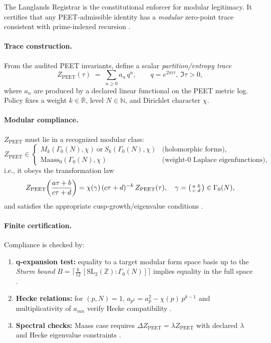 \documentclass[12pt]{amsart}
\theoremstyle{plain}
\begin{document}
The Langlands Registrar is the constitutional enforcer for modular legitimacy. It certifies that any PEET-admissible identity has a \emph{modular} zero-point trace consistent with prime-indexed recursion \cite{vanGelder2025pirtm}.

\paragraph{Trace construction.}
From the audited PEET invariants, define a scalar \emph{partition/entropy trace}
\[
Z_{\mathrm{PEET}}(\tau)\;=\;\sum_{n\ge 0} a_n\,q^n,\qquad q=e^{2\pi i\tau},\ \Im\tau>0,
\]
where $a_n$ are produced by a declared linear functional on the PEET metric log. Policy fixes a weight $k\in\mathbb{R}$, level $N\in\mathbb{N}$, and Dirichlet character $\chi$.

\paragraph{Modular compliance.}
$Z_{\mathrm{PEET}}$ must lie in a recognized modular class:
\[
Z_{\mathrm{PEET}}\in
\begin{cases}
M_k(\Gamma_0(N),\chi)\ \text{or}\ S_k(\Gamma_0(N),\chi) & \text{(holomorphic forms)},\\[2pt]
\text{Maass}_0(\Gamma_0(N),\chi) & \text{(weight-0 Laplace eigenfunctions)},
\end{cases}
\]
i.e., it obeys the transformation law
\[
Z_{\mathrm{PEET}}\!\left(\frac{a\tau+b}{c\tau+d}\right)
= \chi(\gamma)\,(c\tau+d)^{-k}\,Z_{\mathrm{PEET}}(\tau),\quad \gamma=\begin{psmallmatrix}a&b\\c&d\end{psmallmatrix}\in\Gamma_0(N),
\]
and satisfies the appropriate cusp-growth/eigenvalue conditions \cite{serre1973course,diamond2005first,iwaniec2002spectral}.

\paragraph{Finite certification.}
Compliance is checked by:
\begin{enumerate}
  \item \textbf{q-expansion test:} equality to a target modular form space basis up to the \emph{Sturm bound}
  \(
  B=\big\lceil \tfrac{k}{12}\,[\mathrm{SL}_2(\mathbb{Z}):\Gamma_0(N)]\big\rceil
  \)
  implies equality in the full space \cite{sturm1987congruence}.
  \item \textbf{Hecke relations:} for $(p,N)=1$,
  \(
  a_{p^2}=a_p^2-\chi(p)\,p^{k-1}
  \)
  and multiplicativity of $a_{mn}$ verify Hecke compatibility \cite{diamond2005first,serre1973course}.
  \item \textbf{Spectral checks:} Maass case requires $\Delta Z_{\mathrm{PEET}}=\lambda Z_{\mathrm{PEET}}$ with declared $\lambda$ and Hecke eigenvalue constraints \cite{iwaniec2002spectral}.
\end{enumerate}
\end{document}
